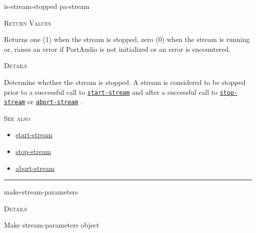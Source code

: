 \documentclass[a4paper]{report}
\begin{document}
    \label{portaudio__fun__is-stream-stopped}
    \begin{defun}[Function]
    is-stream-stopped pa-stream


    
    \bigskip
    \textsc{Return Values}


Returns one (1) when the stream is stopped, zero (0) when the stream is running or, raises an error if PortAudio is not initialized or an error is encountered.


	
    \bigskip
    \textsc{Details}

Determine whether the stream is stopped. A stream is considered to be stopped prior to a successful call to \hyperref[portaudio__fun__start-stream]{\texttt{start-stream}}
   and after a successful call to \hyperref[portaudio__fun__stop-stream]{\texttt{stop-stream}}
   or \hyperref[portaudio__fun__abort-stream]{\texttt{abort-stream}}
  .




      
    \bigskip
    \textsc{See also}


	
    \begin{itemize}
    
	  
    \item
    \hyperref[portaudio__fun__start-stream]{start-stream}
    
    \item
    \hyperref[portaudio__fun__stop-stream]{stop-stream}
    
    \item
    \hyperref[portaudio__fun__abort-stream]{abort-stream}
    
	
    \end{itemize}
  
      


    
    \end{defun}
  
  

    \rule{\linewidth}{0.1mm}
    
    \label{portaudio__fun__make-stream-parameters}
    \begin{defun}[Function]
    make-stream-parameters


	
    \bigskip
    \textsc{Details}

Make stream-parameters object


    
    \end{defun}
  
\end{document}
